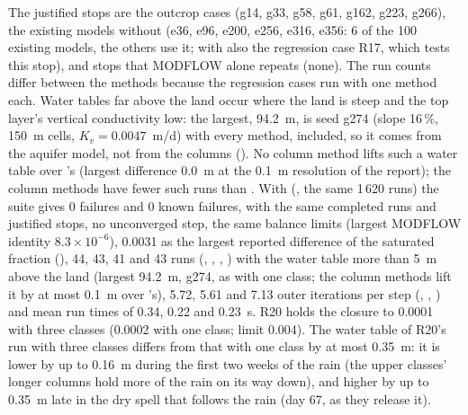 The justified stops are the outcrop cases (g14, g33, g58, g61, g162, g223, g266), the existing models without
 (e36, e96, e200, e256, e316, e356: 6 of the 100 existing models, the others use it; with  also
the regression case R17, which tests this stop), and stops that MODFLOW alone repeats (none). The run counts differ
between the methods because the regression cases run with one method each. Water tables far above the land occur where
the land is steep and the top layer's vertical conductivity low: the largest, 94.2~m, is seed g274 (slope 16\,\%,
150~m cells, $K_v=0.0047$~m/d) with every method,  included, so it comes from the aquifer model, not from the
columns (). No column method lifts such a water table over 's (largest difference 0.0~m at
the 0.1~m resolution of the report); the column methods have fewer such runs than . With
 (, the same 1\,620 runs) the suite gives 0 failures and 0 known
failures, with the same completed runs and justified stops, no unconverged step, the same balance limits (largest
MODFLOW identity $8.3\times10^{-6}$), 0.0031 as the largest reported difference of the saturated fraction (),
44, 43, 41 and 43 runs (, , , ) with the water table more than 5~m above the land (largest 94.2~m, g274, as
with one class; the column methods lift it by at most 0.1~m over 's), 5.72, 5.61 and 7.13 outer iterations per
step (, , ) and mean run times of 0.34, 0.22 and 0.23~s. R20 holds the closure to
0.0001 with three classes (0.0002 with one class; limit 0.004). The water table of R20's  run with three
classes differs from that with one class by at most 0.35~m: it is lower by up to 0.16~m during the first two weeks of the
rain (the upper classes' longer columns hold more of the rain on its way down), and higher by up to 0.35~m late in the
dry spell that follows the rain (day 67, as they release it).

